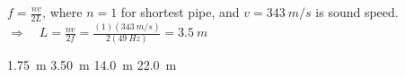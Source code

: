 \documentclass[answers]{exam}
\begin{document}
\begin{questions}
\ifprintanswers
{\color{red}
$f = \frac{nv}{2L}$, where $n=1$ for shortest pipe, and $v = \SI{343}{m/s}$ is sound speed. $\Rightarrow \quad L = \frac{nv}{2f} = \frac{(1)(\SI{343}{m/s})}{2(\SI{49}{Hz})} = \boxed{\SI{3.5}{m}}$
}
\fi

\begin{randomizechoices}
    \choice \SI{1.75}{m}
    \correctchoice \SI{3.50}{m}
    \choice \SI{14.0}{m}
    \choice \SI{22.0}{m}
\end{randomizechoices}





\end{questions}
\end{document}
